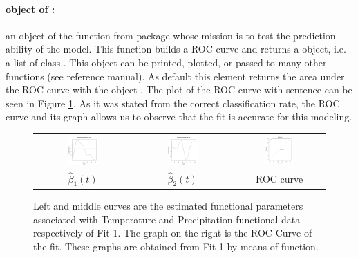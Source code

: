 \paragraph{  object of :} an object of the  function from  package whose mission is to test the prediction ability of the model. This function builds a ROC curve and returns a  object, i.e. a list of class . This object can be printed, plotted, or passed to many other functions (see reference manual). As default this element returns the area under the ROC curve with the object . The plot of the ROC curve with sentence  can be seen in Figure \ref{Fit1}. As it was stated from the correct classification rate, the ROC curve and its graph allows us to observe that the fit is accurate for this modeling.

\begin{figure}
\begin{center}
\begin{tabular}{ccc}
\includegraphics[width=0.33\textwidth]{Graphs/Fit1FunParam1.png} & \includegraphics[width=0.33\textwidth]{Graphs/Fit1FunParam2.png} &
\includegraphics[width=0.33\textwidth]{Graphs/Fit1ROC.png} \\
$\hat{\beta}_1(t)$ & $\hat{\beta}_2(t)$ & ROC curve \\
\end{tabular}
\end{center}
\caption{Left and middle curves are the estimated functional parameters associated with Temperature and Precipitation functional data respectively of Fit 1. The graph on the right is the ROC Curve of the fit. These graphs are obtained from Fit 1 by means of  function.}
\label{Fit1}
\end{figure}


